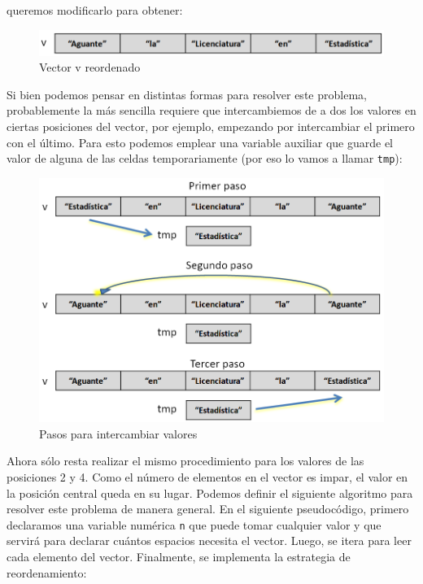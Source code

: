 \documentclass[
]{book}
\begin{document}
queremos modificarlo para obtener:

\begin{figure}

{\centering \includegraphics[width=0.8\linewidth]{images/05_estructuras/estr12} 

}

\caption{Vector v reordenado}\label{fig:inv2}
\end{figure}

Si bien podemos pensar en distintas formas para resolver este problema, probablemente la más sencilla requiere que intercambiemos de a dos los valores en ciertas posiciones del vector, por ejemplo, empezando por intercambiar el primero con el último. Para esto podemos emplear una variable auxiliar que guarde el valor de alguna de las celdas temporariamente (por eso lo vamos a llamar \texttt{tmp}):

\begin{figure}

{\centering \includegraphics[width=0.8\linewidth]{images/05_estructuras/estr13} 

}

\caption{Pasos para intercambiar valores}\label{fig:inv3}
\end{figure}

Ahora sólo resta realizar el mismo procedimiento para los valores de las posiciones 2 y 4. Como el número de elementos en el vector es impar, el valor en la posición central queda en su lugar. Podemos definir el siguiente algoritmo para resolver este problema de manera general. En el siguiente pseudocódigo, primero declaramos una variable numérica \texttt{n} que puede tomar cualquier valor y que servirá para declarar cuántos espacios necesita el vector. Luego, se itera para leer cada elemento del vector. Finalmente, se implementa la estrategia de reordenamiento:
\end{document}
